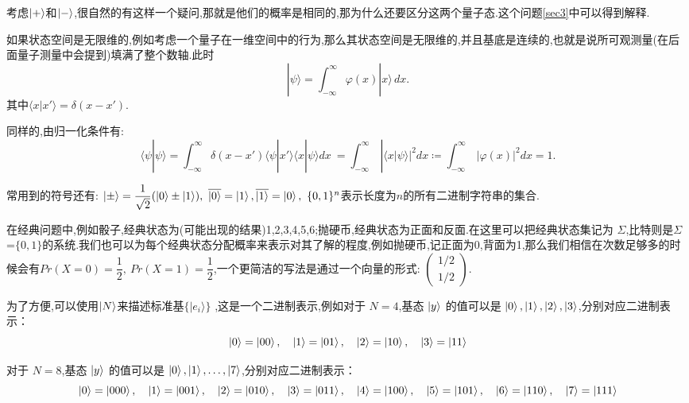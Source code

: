 考虑$\ket{+}$和$\ket{-}$,很自然的有这样一个疑问,那就是他们的概率是相同的,那为什么还要区分这两个量子态.这个问题\cref{sec3}中可以得到解释.

如果状态空间是无限维的,例如考虑一个量子在一维空间中的行为,那么其状态空间是无限维的,并且基底是连续的,也就是说所可观测量(在后面量子测量中会提到)填满了整个数轴.此时
\begin{equation}
	|\psi\rangle = \int_{-\infty}^{\infty} \varphi(x) |x\rangle \, dx.
\end{equation}
其中$ \langle x|x'\rangle =\delta (x-x')$.

同样的,由归一化条件有:
$$
\langle \psi | \psi \rangle =  \int_{-\infty}^{\infty} \delta (x-x') \langle \psi | x' \rangle \langle x | \psi \rangle dx \  = \int_{-\infty}^{\infty} \ | \langle x | \psi \rangle |^{2} dx \coloneqq \int_{-\infty}^{\infty} \ |\varphi(x)  |^{2} dx = 1.
$$

常用到的符号还有:
$\ket{\pm}=\dfrac{1}{\sqrt{2}}(\ket{0}\pm\ket{1}),~\overline{\ket{0}}=\ket{1}, \overline{\ket{1}}=\ket{0},~\{0,1\}^n$表示长度为$n$的所有二进制字符串的集合.

\begin{explain}[经典状态以及概率向量]\label{classicalstate}
在经典问题中,例如骰子,经典状态为(可能出现的结果)1,2,3,4,5,6;抛硬币,经典状态为正面和反面.在这里可以把经典状态集记为 $ \Sigma $,比特则是$ \Sigma $=$\{0,1\}$的系统.我们也可以为每个经典状态分配概率来表示对其了解的程度,例如抛硬币,记正面为0,背面为1,那么我们相信在次数足够多的时候会有$Pr(X = 0) = \dfrac{1}{2} ,~ Pr(X = 1) = \dfrac{1}{2}$,一个更简洁的写法是通过一个向量的形式:
$\begin{pmatrix}
	1/2 \\
	1/2
\end{pmatrix}$.
\end{explain}

\begin{explain}
	为了方便,可以使用$\ket{N}$来描述标准基$ \{|e_i\rangle\} $ ,这是一个二进制表示,例如对于 $N=4$,基态 $\ket{y}$ 的值可以是 $\ket{0}, \ket{1}, \ket{2},\ket{3}$,分别对应二进制表示：
	$$
	\ket{0} = \ket{00}, \quad
	\ket{1} = \ket{01}, \quad
	\ket{2} = \ket{10}, \quad
	\ket{3} = \ket{11}
	$$
	
	对于 $N=8$,基态 $\ket{y}$ 的值可以是 $\ket{0}, \ket{1}, \dots, \ket{7}$,分别对应二进制表示：
	$$
	\ket{0} = \ket{000}, \quad
	\ket{1} = \ket{001}, \quad
	\ket{2} = \ket{010}, \quad
	\ket{3} = \ket{011}, \quad
	\ket{4} = \ket{100}, \quad
	\ket{5} = \ket{101}, \quad
	\ket{6} = \ket{110}, \quad
	\ket{7} = \ket{111}
	$$
\end{explain}

